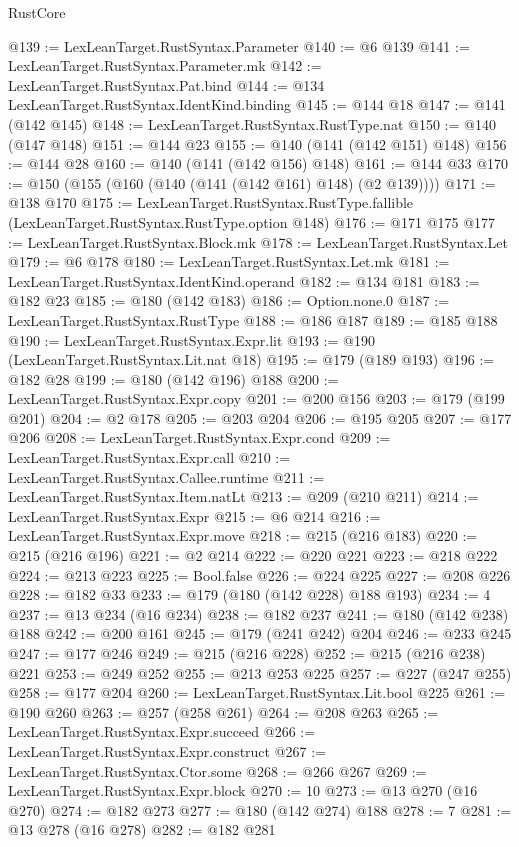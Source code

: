 \begin{lexlean}{RustCore}
\begin{coremodule}
@139 := LexLeanTarget.RustSyntax.Parameter
@140 := @6 @139
@141 := LexLeanTarget.RustSyntax.Parameter.mk
@142 := LexLeanTarget.RustSyntax.Pat.bind
@144 := @134 LexLeanTarget.RustSyntax.IdentKind.binding
@145 := @144 @18
@147 := @141 (@142 @145)
@148 := LexLeanTarget.RustSyntax.RustType.nat
@150 := @140 (@147 @148)
@151 := @144 @23
@155 := @140 (@141 (@142 @151) @148)
@156 := @144 @28
@160 := @140 (@141 (@142 @156) @148)
@161 := @144 @33
@170 := @150 (@155 (@160 (@140 (@141 (@142 @161) @148) (@2 @139))))
@171 := @138 @170
@175 := LexLeanTarget.RustSyntax.RustType.fallible (LexLeanTarget.RustSyntax.RustType.option @148)
@176 := @171 @175
@177 := LexLeanTarget.RustSyntax.Block.mk
@178 := LexLeanTarget.RustSyntax.Let
@179 := @6 @178
@180 := LexLeanTarget.RustSyntax.Let.mk
@181 := LexLeanTarget.RustSyntax.IdentKind.operand
@182 := @134 @181
@183 := @182 @23
@185 := @180 (@142 @183)
@186 := Option.none.{0}
@187 := LexLeanTarget.RustSyntax.RustType
@188 := @186 @187
@189 := @185 @188
@190 := LexLeanTarget.RustSyntax.Expr.lit
@193 := @190 (LexLeanTarget.RustSyntax.Lit.nat @18)
@195 := @179 (@189 @193)
@196 := @182 @28
@199 := @180 (@142 @196) @188
@200 := LexLeanTarget.RustSyntax.Expr.copy
@201 := @200 @156
@203 := @179 (@199 @201)
@204 := @2 @178
@205 := @203 @204
@206 := @195 @205
@207 := @177 @206
@208 := LexLeanTarget.RustSyntax.Expr.cond
@209 := LexLeanTarget.RustSyntax.Expr.call
@210 := LexLeanTarget.RustSyntax.Callee.runtime
@211 := LexLeanTarget.RustSyntax.Item.natLt
@213 := @209 (@210 @211)
@214 := LexLeanTarget.RustSyntax.Expr
@215 := @6 @214
@216 := LexLeanTarget.RustSyntax.Expr.move
@218 := @215 (@216 @183)
@220 := @215 (@216 @196)
@221 := @2 @214
@222 := @220 @221
@223 := @218 @222
@224 := @213 @223
@225 := Bool.false
@226 := @224 @225
@227 := @208 @226
@228 := @182 @33
@233 := @179 (@180 (@142 @228) @188 @193)
@234 := 4
@237 := @13 @234 (@16 @234)
@238 := @182 @237
@241 := @180 (@142 @238) @188
@242 := @200 @161
@245 := @179 (@241 @242) @204
@246 := @233 @245
@247 := @177 @246
@249 := @215 (@216 @228)
@252 := @215 (@216 @238) @221
@253 := @249 @252
@255 := @213 @253 @225
@257 := @227 (@247 @255)
@258 := @177 @204
@260 := LexLeanTarget.RustSyntax.Lit.bool @225
@261 := @190 @260
@263 := @257 (@258 @261)
@264 := @208 @263
@265 := LexLeanTarget.RustSyntax.Expr.succeed
@266 := LexLeanTarget.RustSyntax.Expr.construct
@267 := LexLeanTarget.RustSyntax.Ctor.some
@268 := @266 @267
@269 := LexLeanTarget.RustSyntax.Expr.block
@270 := 10
@273 := @13 @270 (@16 @270)
@274 := @182 @273
@277 := @180 (@142 @274) @188
@278 := 7
@281 := @13 @278 (@16 @278)
@282 := @182 @281

\end{coremodule}
\end{lexlean}
